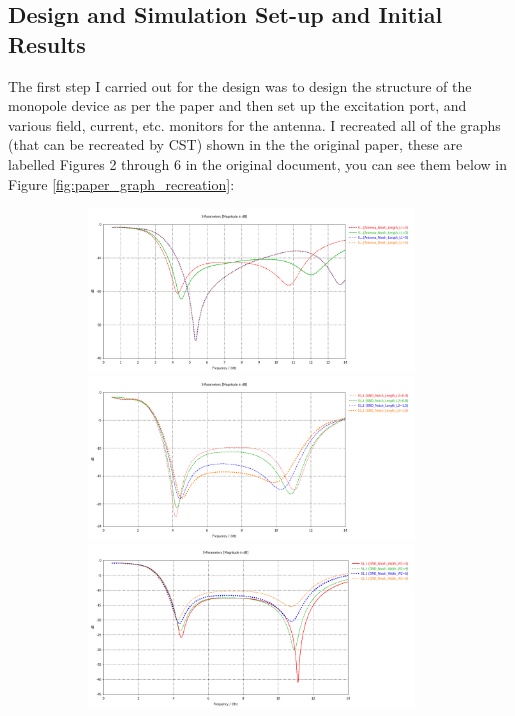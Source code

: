 \documentclass[colorlinks,11pt,a4paper,normalphoto,withhyper,ragged2e]{altareport}
\begin{document}
\newpage




\subsection{Design and Simulation Set-up and Initial Results}
The first step I carried out for the design was to design the structure of the monopole device as per the paper and then set up the excitation port, and various field, current, etc. monitors for the antenna. I recreated all of the graphs (that can be recreated by CST) shown in the the original paper, these are labelled Figures 2 through 6 in the original document, you can see them below in Figure \ref{fig:paper_graph_recreation}: \linebreak


\begin{figure}[ht!]
\centering
	\begin{subfigure}[b]{0.45\linewidth}
    \centering
    	\includegraphics[width=0.95\textwidth]{Images/S1,1-fig-2-recreation.png}\\[2mm]
    	\includegraphics[width=0.95\textwidth]{Images/S1,1-fig-3-recreation.png}\\[2mm]
    	\includegraphics[width=0.95\textwidth]{Images/S1,1-fig-4-recreation.png}

\end{subfigure}
\end{figure}
\end{document}
